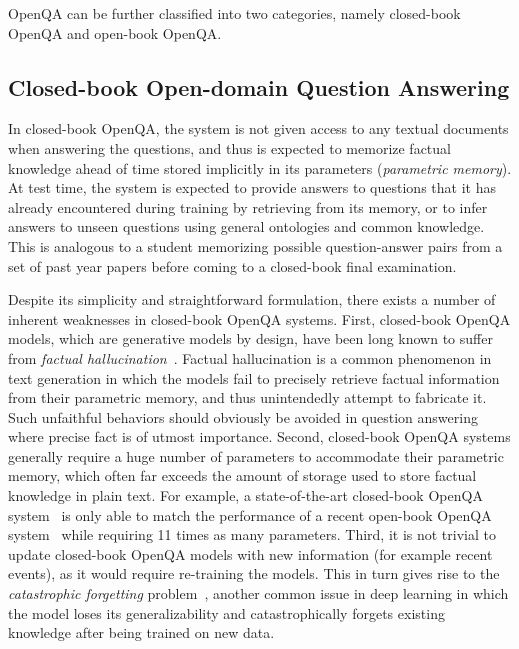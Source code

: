 %
OpenQA can be further classified into two categories, namely closed-book OpenQA and open-book OpenQA.

\subsection{Closed-book Open-domain Question Answering}
\label{sec:close_book}
%
In closed-book OpenQA, the system is not given access to any textual documents when answering the questions, and thus is expected to memorize factual knowledge ahead of time stored implicitly in its parameters (\emph{parametric memory}).
%
At test time, the system is expected to provide answers to questions that it has already encountered during training by
retrieving from its memory, or to infer answers to unseen questions using general ontologies and common
knowledge.
%
This is analogous to a student memorizing possible question-answer pairs from a set of past year papers before coming to a closed-book final examination.

%
Despite its simplicity and straightforward formulation, there exists a number of inherent weaknesses in closed-book OpenQA systems.
%
First, closed-book OpenQA models, which are generative models by design, have been long known to suffer from \emph{factual hallucination}~\cite{ji2022survey}.
%
Factual hallucination is a common phenomenon in text generation in which the models fail to precisely retrieve factual information from their parametric memory, and thus unintendedly attempt to fabricate it.
%
Such unfaithful behaviors should obviously be avoided in question answering where precise fact is of utmost importance.
%
Second, closed-book OpenQA systems generally require a huge number of parameters to accommodate their parametric memory, which often far exceeds the amount of storage used to store factual knowledge in plain text.
%
For example, a state-of-the-art closed-book OpenQA system~\cite{roberts2020much} is only able to match the performance of a recent open-book OpenQA system~\cite{karpukhin2020dense} while requiring 11 times as many parameters.
%
Third, it is not trivial to update closed-book OpenQA models with new information (for example recent events), as it would require re-training the models.
%
This in turn gives rise to the \emph{catastrophic forgetting} problem~\cite{kemker2018measuring}, another common issue in deep learning in which the model loses its generalizability and catastrophically forgets existing knowledge after being trained on new data.

